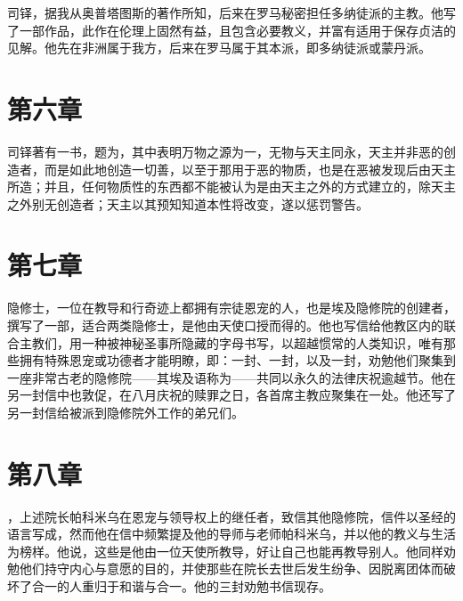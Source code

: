 司铎，据我从奥普塔图斯的著作所知，后来在罗马秘密担任多纳徒派的主教。他写了一部作品，此作在伦理上固然有益，且包含必要教义，并富有适用于保存贞洁的见解。他先在非洲属于我方，后来在罗马属于其本派，即多纳徒派或蒙丹派。\par


\section{第六章}

司铎著有一书，题为，其中表明万物之源为一，无物与天主同永，天主并非恶的创造者，而是如此地创造一切善，以至于那用于恶的物质，也是在恶被发现后由天主所造；并且，任何物质性的东西都不能被认为是由天主之外的方式建立的，除天主之外别无创造者；天主以其预知知道本性将改变，遂以惩罚警告。\par


\section{第七章}

隐修士，一位在教导和行奇迹上都拥有宗徒恩宠的人，也是埃及隐修院的创建者，撰写了一部，适合两类隐修士，是他由天使口授而得的。他也写信给他教区内的联合主教们，用一种被神秘圣事所隐藏的字母书写，以超越惯常的人类知识，唯有那些拥有特殊恩宠或功德者才能明瞭，即：一封、一封，以及一封，劝勉他们聚集到一座非常古老的隐修院——其埃及语称为——共同以永久的法律庆祝逾越节。他在另一封信中也敦促，在八月庆祝的赎罪之日，各首席主教应聚集在一处。他还写了另一封信给被派到隐修院外工作的弟兄们。\par


\section{第八章}

，上述院长帕科米乌在恩宠与领导权上的继任者，致信其他隐修院，信件以圣经的语言写成，然而他在信中频繁提及他的导师与老师帕科米乌，并以他的教义与生活为榜样。他说，这些是他由一位天使所教导，好让自己也能再教导别人。他同样劝勉他们持守内心与意愿的目的，并使那些在院长去世后发生纷争、因脱离团体而破坏了合一的人重归于和谐与合一。他的三封劝勉书信现存。\par

